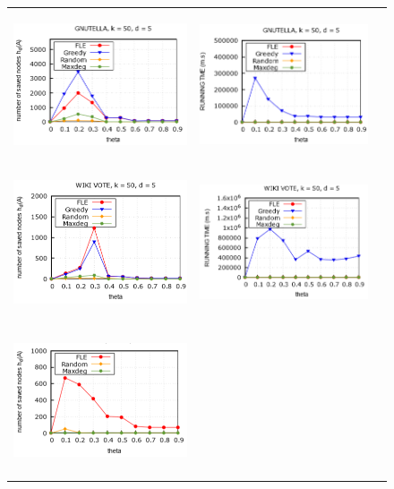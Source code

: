 \begin{figure}[H]
	\begin{tabular}{lll}
		\includegraphics[height = 4.4cm]{picture/FLE/gnu_res_theta} &
		\includegraphics[height = 4.4cm]{picture/FLE/gnu_time_theta} 
		\\
		\includegraphics[height = 4.4cm]{picture/FLE/wiki_res_theta} &
		\includegraphics[height = 4.4cm]{picture/FLE/wiki_time_theta} 
		\\
		\includegraphics[height = 4.4cm]{picture/FLE/amazon_res_theta} &

\end{tabular}
\end{figure}
